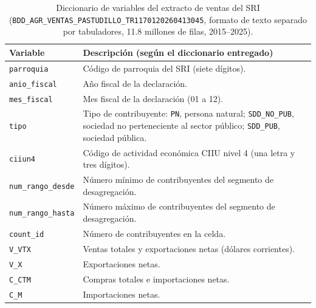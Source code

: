 \documentclass[12pt,a4paper]{article}
\begin{document}
\begin{table}[H]
  \caption[Diccionario del extracto de ventas del SRI]{Diccionario de variables del extracto de ventas del SRI (\texttt{BDD\_AGR\_VENTAS\_PASTUDILLO\_TR1170120260413045}, formato de texto separado por tabuladores, 11.8 millones de filas, 2015--2025).}
  \label{tab:diccionario}
  \small
  \begin{tabular}{|>{\raggedright\arraybackslash}p{1.5in}|>{\raggedright\arraybackslash}p{4.3in}|}
    \hline
    \textbf{Variable} & \textbf{Descripción (según el diccionario entregado)} \\ \hline
    \texttt{parroquia}        & Código de parroquia del SRI (siete dígitos). \\ \hline
    \texttt{anio\_fiscal}     & Año fiscal de la declaración. \\ \hline
    \texttt{mes\_fiscal}      & Mes fiscal de la declaración (01 a 12). \\ \hline
    \texttt{tipo}             & Tipo de contribuyente: \texttt{PN}, persona natural; \texttt{SDD\_NO\_PUB}, sociedad no perteneciente al sector público; \texttt{SDD\_PUB}, sociedad pública. \\ \hline
    \texttt{ciiun4}           & Código de actividad económica CIIU nivel 4 (una letra y tres dígitos). \\ \hline
    \texttt{num\_rango\_desde} & Número mínimo de contribuyentes del segmento de desagregación. \\ \hline
    \texttt{num\_rango\_hasta} & Número máximo de contribuyentes del segmento de desagregación. \\ \hline
    \texttt{count\_id}        & Número de contribuyentes en la celda. \\ \hline
    \texttt{V\_VTX}           & Ventas totales y exportaciones netas (dólares corrientes). \\ \hline
    \texttt{V\_X}             & Exportaciones netas. \\ \hline
    \texttt{C\_CTM}           & Compras totales e importaciones netas. \\ \hline
    \texttt{C\_M}             & Importaciones netas. \\ \hline
  \end{tabular}
\end{table}
\end{document}
